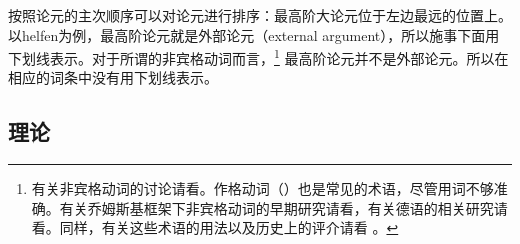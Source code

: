 按照论元的主次顺序可以对论元进行排序：最高阶大论元位于左边最远的位置上。以helfen为例，最高阶论元就是外部论元（external argument），所以施事下面用下划线表示。对于所谓的非宾格动词而言，\footnote{
有关非宾格动词的讨论请看。作格动词（）也是常见的术语，尽管用词不够准确。有关乔姆斯基框架下非宾格动词的早期研究请看，有关德语的相关研究请看。同样，有关这些术语的用法以及历史上的评介请看 。
}
最高阶论元并不是外部论元。所以在相应的词条中没有用下划线表示。

\subsection{\xbar 理论}
\label{Abschnitt-X-Bar}

